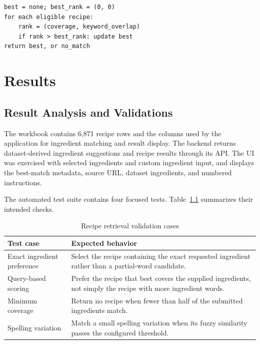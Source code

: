 \documentclass[12pt,a4paper]{report}
\begin{document}
\begin{small}
\begin{verbatim}
best = none; best_rank = (0, 0)
for each eligible recipe:
    rank = (coverage, keyword_overlap)
    if rank > best_rank: update best
return best, or no_match
\end{verbatim}
\end{small}

\chapter{Results}
\label{chap:results}

\section{Result Analysis and Validations}
\label{sec:result_analysis}

The workbook contains 6,871 recipe rows and the columns used by the application for ingredient matching and result display. The backend returns dataset-derived ingredient suggestions and recipe results through its API. The UI was exercised with selected ingredients and custom ingredient input, and displays the best-match metadata, source URL, dataset ingredients, and numbered instructions.

The automated test suite contains four focused tests. Table~\ref{tab:tests} summarizes their intended checks.

\begin{table}[H]
\centering
\caption{Recipe retrieval validation cases}
\label{tab:tests}
\begin{tabular}{|p{}|p{}|}
\hline
\textbf{Test case} & \textbf{Expected behavior}\\
\hline
Exact ingredient preference & Select the recipe containing the exact requested ingredient rather than a partial-word candidate.\\
\hline
Query-based scoring & Prefer the recipe that best covers the supplied ingredients, not simply the recipe with more ingredient words.\\
\hline
Minimum coverage & Return no recipe when fewer than half of the submitted ingredients match.\\
\hline
Spelling variation & Match a small spelling variation when its fuzzy similarity passes the configured threshold.\\
\hline
\end{tabular}
\end{table}
\end{document}
